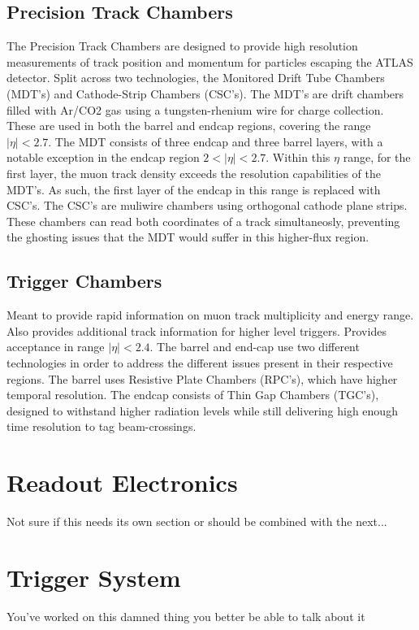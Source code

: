     \subsection{Precision Track Chambers}
        The Precision Track Chambers are designed to provide high resolution measurements of track position and momentum for particles escaping the ATLAS detector. Split across two technologies, the Monitored Drift Tube Chambers (MDT's) and Cathode-Strip Chambers (CSC's).
        The MDT's are drift chambers filled with Ar/CO2 gas using a tungsten-rhenium wire for charge collection. These are used in both the barrel and endcap regions, covering the range $|\eta| < 2.7$. The MDT consists of three endcap and three barrel layers, with a notable exception in the endcap region $2 < |\eta| < 2.7$. Within this $\eta$ range, for the first layer, the muon track density exceeds the resolution capabilities of the MDT's. As such, the first layer of the endcap in this range is replaced with CSC's. The CSC's are muliwire chambers using orthogonal cathode plane strips. These chambers can read both coordinates of a track simultaneosly, preventing the ghosting issues that the MDT would suffer in this higher-flux region.

    \subsection{Trigger Chambers}
        Meant to provide rapid information on muon track multiplicity and energy range.
        Also provides additional track information for higher level triggers.
        Provides acceptance in range $|\eta| < 2.4$.
        The barrel and end-cap use two different technologies in order to address the different issues present in their respective regions.
        The barrel uses Resistive Plate Chambers (RPC's), which have higher temporal resolution. The endcap consists of Thin Gap Chambers (TGC's), designed to withstand higher radiation levels while still delivering high enough time resolution to tag beam-crossings.




\section{Readout Electronics} %
    Not sure if this needs its own section or should be combined with the next...

\section{Trigger System} %
    You've worked on this damned thing you better be able to talk about it
